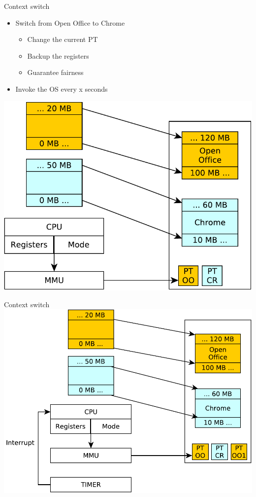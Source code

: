 \documentclass{beamer}
\begin{document}
\begin{frame}{Context switch}
    \begin{itemize}
    \item Switch from Open Office to Chrome
    \begin{itemize}
    \item<2-> Change the current PT
    \item<3-> Backup the registers
    \item<4-> Guarantee fairness
    \end{itemize}
    \item<5-> Invoke the OS every x seconds
    \end{itemize}
    \includegraphics[width=0.3\linewidth]{process}
\end{frame}

\begin{frame}{Context switch}
  \includegraphics[width=0.7\linewidth]{process3}
\end{frame}
\end{document}
